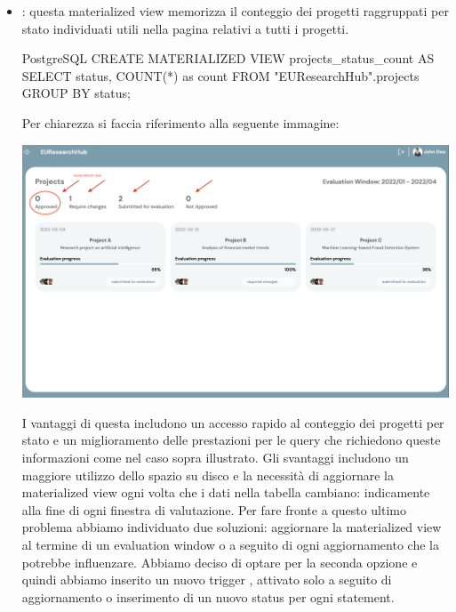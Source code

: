\documentclass{report}
\begin{document}
\begin{itemize}
\item {}: questa materialized view memorizza il conteggio dei progetti raggruppati per stato individuati utili nella pagina relativi a tutti i progetti. \\

\begin{minipage}{\linewidth}
\begin{imtaCode}{PostgreSQL}
CREATE MATERIALIZED VIEW projects_status_count AS
SELECT status, COUNT(*) as count
FROM "EUResearchHub".projects
GROUP BY status;
\end{imtaCode}
\end{minipage}

Per chiarezza si faccia riferimento alla seguente immagine:
\begin{center}
\includegraphics[scale = 0.04]{4.png}
\end{center}
I vantaggi di questa includono un accesso rapido al conteggio dei progetti per stato e un miglioramento delle prestazioni per le query che richiedono queste informazioni come nel caso sopra illustrato. Gli svantaggi includono un maggiore utilizzo dello spazio su disco e la necessità di aggiornare la materialized view ogni volta che i dati nella tabella  cambiano: indicamente alla fine di ogni finestra di valutazione.  Per fare fronte a questo ultimo problema abbiamo individuato due soluzioni: aggiornare la materialized view al termine di un evaluation window o a seguito di ogni aggiornamento che la potrebbe influenzare. Abbiamo deciso di optare per la seconda opzione e quindi abbiamo inserito un nuovo trigger , attivato solo a seguito di aggiornamento o inserimento di un nuovo status per ogni statement.  \\


\end{itemize}
\end{document}
